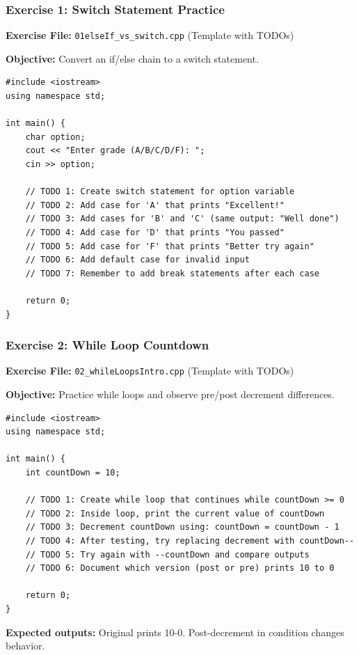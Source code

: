 \documentclass{beamer}
\begin{document}
\begin{frame}[fragile]
\frametitle{Exercise 1: Switch Statement Practice}
\textbf{Exercise File:} \texttt{01elseIf\_vs\_switch.cpp} (Template with TODOs)

\pause
\textbf{Objective:} Convert an if/else chain to a switch statement.

\begin{verbatim}
#include <iostream>
using namespace std;

int main() {
    char option;
    cout << "Enter grade (A/B/C/D/F): ";
    cin >> option;
    
    // TODO 1: Create switch statement for option variable
    // TODO 2: Add case for 'A' that prints "Excellent!"
    // TODO 3: Add cases for 'B' and 'C' (same output: "Well done")
    // TODO 4: Add case for 'D' that prints "You passed"
    // TODO 5: Add case for 'F' that prints "Better try again"
    // TODO 6: Add default case for invalid input
    // TODO 7: Remember to add break statements after each case
    
    return 0;
}
\end{verbatim}
\end{frame}

\begin{frame}[fragile]
\frametitle{Exercise 2: While Loop Countdown}
\textbf{Exercise File:} \texttt{02\_whileLoopsIntro.cpp} (Template with TODOs)

\pause
\textbf{Objective:} Practice while loops and observe pre/post decrement differences.

\begin{verbatim}
#include <iostream>
using namespace std;

int main() {
    int countDown = 10;
    
    // TODO 1: Create while loop that continues while countDown >= 0
    // TODO 2: Inside loop, print the current value of countDown
    // TODO 3: Decrement countDown using: countDown = countDown - 1
    // TODO 4: After testing, try replacing decrement with countDown--
    // TODO 5: Try again with --countDown and compare outputs
    // TODO 6: Document which version (post or pre) prints 10 to 0
    
    return 0;
}
\end{verbatim}

\textbf{Expected outputs:} Original prints 10-0. Post-decrement in condition changes behavior.
\end{frame}
\end{document}
